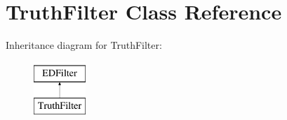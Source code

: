 \hypertarget{classTruthFilter}{}\section{Truth\+Filter Class Reference}
\label{classTruthFilter}
Inheritance diagram for Truth\+Filter\+:\begin{figure}[H]
\begin{center}
\leavevmode
\includegraphics[height=2.000000cm]{classTruthFilter}
\end{center}
\end{figure}
